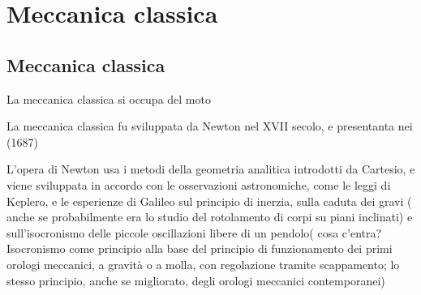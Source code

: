 \documentclass[letterpaper,10pt,italian]{jupyterBook}
\begin{document}
\part{Meccanica classica}

\sphinxstepscope


\chapter{Meccanica classica}
\label{\detokenize{ch/mechanics:meccanica-classica}}\label{\detokenize{ch/mechanics:physics-hs-mechanics}}\label{\detokenize{ch/mechanics::doc}}
\sphinxAtStartPar
La meccanica classica si occupa del moto 

\sphinxAtStartPar
La meccanica classica fu sviluppata da Newton nel XVII secolo, e presentanta nei  (1687)  

\sphinxAtStartPar
L’opera di Newton  usa i metodi della geometria analitica introdotti da Cartesio, e viene sviluppata in accordo con le osservazioni astronomiche, come le leggi di Keplero, e le esperienze di Galileo sul principio di inerzia, sulla caduta dei gravi ( anche se probabilmente era lo studio del rotolamento di corpi su piani inclinati) e sull’isocronismo delle piccole oscillazioni libere di un pendolo( cosa c’entra? Isocronismo come principio alla base del principio di funzionamento dei primi orologi meccanici, a gravità o a molla, con regolazione tramite scappamento; lo stesso principio, anche se migliorato, degli orologi meccanici contemporanei)
\end{document}
